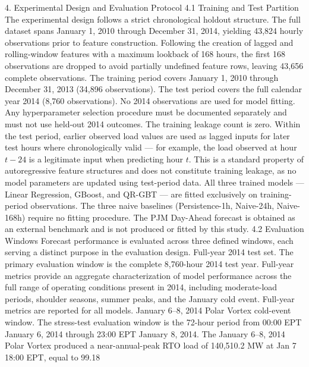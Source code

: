 4. Experimental Design and Evaluation Protocol
4.1 Training and Test Partition
The experimental design follows a strict chronological holdout structure. The full dataset spans January 1, 2010 through December 31, 2014, yielding 43,824 hourly observations prior to feature construction. Following the creation of lagged and rolling-window features with a maximum lookback of 168 hours, the first 168 observations are dropped to avoid partially undefined feature rows, leaving 43,656 complete observations.
The training period covers January 1, 2010 through December 31, 2013 (34,896 observations). The test period covers the full calendar year 2014 (8,760 observations). No 2014 observations are used for model fitting. Any hyperparameter selection procedure must be documented separately and must not use held-out 2014 outcomes. The training leakage count is zero.
Within the test period, earlier observed load values are used as lagged inputs for later test hours where chronologically valid — for example, the load observed at hour $t - 24$ is a legitimate input when predicting hour $t$. This is a standard property of autoregressive feature structures and does not constitute training leakage, as no model parameters are updated using test-period data.
All three trained models — Linear Regression, GBoost, and QR-GBT — are fitted exclusively on training-period observations. The three naive baselines (Persistence-1h, Naive-24h, Naive-168h) require no fitting procedure. The PJM Day-Ahead forecast is obtained as an external benchmark and is not produced or fitted by this study.
4.2 Evaluation Windows
Forecast performance is evaluated across three defined windows, each serving a distinct purpose in the evaluation design.
Full-year 2014 test set. The primary evaluation window is the complete 8,760-hour 2014 test year. Full-year metrics provide an aggregate characterization of model performance across the full range of operating conditions present in 2014, including moderate-load periods, shoulder seasons, summer peaks, and the January cold event. Full-year metrics are reported for all models.
January 6–8, 2014 Polar Vortex cold-event window. The stress-test evaluation window is the 72-hour period from 00:00 EPT January 6, 2014 through 23:00 EPT January 8, 2014. The January 6–8, 2014 Polar Vortex produced a near-annual-peak RTO load of 140,510.2 MW at Jan 7 18:00 EPT, equal to 99.18%
